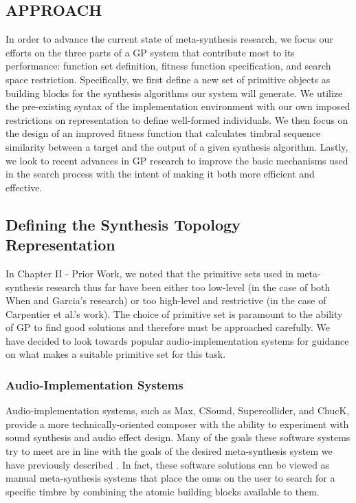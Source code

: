 \documentclass[12pt]{report} 	%
\numberwithin{figure}{chapter}
\numberwithin{table}{chapter}
\numberwithin{equation}{chapter}
\begin{document}
\begin{flushleft}
\vspace*{\QuarterPage}
\chapter{APPROACH} %
In order to advance the current state of meta-synthesis research, we focus our efforts on the three parts of a GP system that contribute most to its performance: function set definition, fitness function specification, and search space restriction. Specifically, we first define a new set of primitive objects as building blocks for the synthesis algorithms our system will generate. We utilize the pre-existing syntax of the implementation environment with our own imposed restrictions on representation to define well-formed individuals. We then focus on the design of an improved fitness function that calculates timbral sequence similarity between a target and the output of a given synthesis algorithm. Lastly, we look to recent advances in GP research to improve the basic mechanisms used in the search process with the intent of making it both more efficient and effective.

\vspace{12pt}
\section{Defining the Synthesis Topology Representation}
In Chapter II - Prior Work, we noted that the primitive sets used in meta-synthesis research thus far have been either too low-level (in the case of both When and Garcia's research) or too high-level and restrictive (in the case of Carpentier et al.'s work). The choice of primitive set is paramount to the ability of GP to find good solutions and therefore must be approached carefully. We have decided to look towards popular audio-implementation systems for guidance on what makes a suitable primitive set for this task.

\vspace{12pt}
\subsection{Audio-Implementation Systems}

Audio-implementation systems, such as Max, CSound, Supercollider, and ChucK, provide a more technically-oriented composer with the ability to experiment with sound synthesis and audio effect design. Many of the goals these software systems try to meet are in line with the goals of the desired meta-synthesis system we have previously described \cite{Moreno:2005bs}. In fact, these software solutions can be viewed as manual meta-synthesis systems that place the onus on the user to search for a specific timbre by combining the atomic building blocks available to them. 


\end{flushleft}
\end{document}
